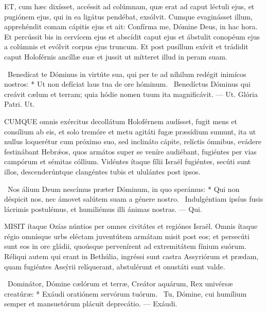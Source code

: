 

\lettrine[lines=2]{E}{T}, cum hæc dixísset, accéssit ad colúmnam, quæ erat ad caput léctuli ejus, et pugiónem ejus, qui in ea ligátus pendébat, exsólvit. Cumque evaginásset illum, apprehéndit comam cápitis ejus et ait: Confírma me, Dómine Deus, in hac hora. Et percússit bis in cervícem ejus et abscídit caput ejus et ábstulit conopéum ejus a colúmnis et evólvit corpus ejus truncum. Et post pusíllum exívit et trádidit caput Holoférnis ancíllæ suæ et jussit ut mítteret illud in peram suam.

\R\ Benedícat te Dóminus in virtúte sua, qui per te ad níhilum redégit inimícos nostros: * Ut non defíciat laus tua de ore hóminum. \V\ Benedíctus Dóminus qui creávit cælum et terram; quia hódie nomen tuum ita magnificávit. — Ut. Glória Patri. Ut.




\lettrine[lines=2]{C}{UMQUE} omnis exércitus decollátum Holoférnem audísset, fugit mens et consílium ab eis, et solo tremóre et metu agitáti fugæ præsídium sumunt, ita ut nullus loquerétur cum próximo suo, sed inclináto cápite, relíctis ómnibus, evádere festinábant Hebrǽos, quos armátos super se veníre audiébant, fugiéntes per vias campórum et sémitas cóllium. Vidéntes ítaque fílii Israël fugiéntes, secúti sunt illos, descenderúntque clangéntes tubis et ululántes post ipsos.

\R\ Nos álium Deum nescímus præter Dóminum, in quo sperámus: * Qui non déspicit nos, nec ámovet salútem suam a génere nostro. \V\ Indulgéntiam ipsíus fusis lácrimis postulémus, et humiliémus illi ánimas nostras. — Qui.


\lettrine[lines=2]{M}{ISIT} ítaque Ozías núntios per omnes civitátes et regiónes Israël. Omnis ítaque régio omnísque urbs eléctam juventútem armátam misit post eos; et persecúti sunt eos in ore gládii, quoúsque pervenírent ad extremitátem fínium suórum. Réliqui autem qui erant in Bethúlia, ingréssi sunt castra Assyriórum et prædam, quam fugiéntes Assýrii relíquerant, abstulérunt et onustáti sunt valde.

\R\ Dominátor, Dómine cælórum et terræ, Creátor aquárum, Rex univérsæ creatúræ: * Exáudi oratiónem servórum tuórum. \V\ Tu, Dómine, cui humílium semper et mansuetórum plácuit deprecátio. — Exáudi.

